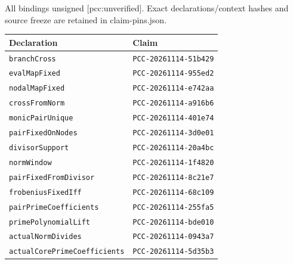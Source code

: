 \documentclass[
  10pt,
]{article}
\begin{document}
All bindings unsigned {[}pcc:unverified{]}. Exact declarations/context
hashes and source freeze are retained in claim-pins.json.

\begin{longtable}[]{@{}ll@{}}
\toprule\noalign{}
Declaration & Claim \\
\midrule\noalign{}
\endhead
\bottomrule\noalign{}
\endlastfoot
\texttt{branchCross} & \texttt{PCC-20261114-51b429} \\
\texttt{evalMapFixed} & \texttt{PCC-20261114-955ed2} \\
\texttt{nodalMapFixed} & \texttt{PCC-20261114-e742aa} \\
\texttt{crossFromNorm} & \texttt{PCC-20261114-a916b6} \\
\texttt{monicPairUnique} & \texttt{PCC-20261114-401e74} \\
\texttt{pairFixedOnNodes} & \texttt{PCC-20261114-3d0e01} \\
\texttt{divisorSupport} & \texttt{PCC-20261114-20a4bc} \\
\texttt{normWindow} & \texttt{PCC-20261114-1f4820} \\
\texttt{pairFixedFromDivisor} & \texttt{PCC-20261114-8c21e7} \\
\texttt{frobeniusFixedIff} & \texttt{PCC-20261114-68c109} \\
\texttt{pairPrimeCoefficients} & \texttt{PCC-20261114-255fa5} \\
\texttt{primePolynomialLift} & \texttt{PCC-20261114-bde010} \\
\texttt{actualNormDivides} & \texttt{PCC-20261114-0943a7} \\
\texttt{actualCorePrimeCoefficients} & \texttt{PCC-20261114-5d35b3} \\
\end{longtable}
\end{document}
